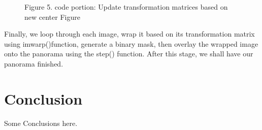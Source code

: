 \documentclass{CUP-JNL-PPS}
\begin{document}
\begin{figure}[t]%
{\caption{Figure 5. code portion: Update transformation matrices based on new center Figure}
}
\end{figure}
Finally, we loop through each image, wrap it based on its transformation matrix using imwarp()function, generate a binary mask, then overlay the wrapped image onto the panorama using the step() function. After this stage, we shall have our panorama finished.





\section{Conclusion}

Some Conclusions here.
\end{document}
